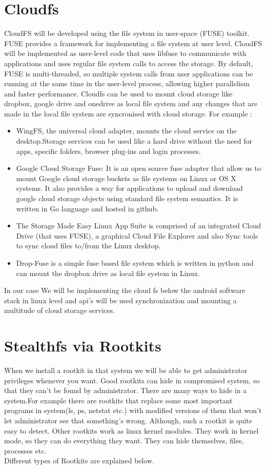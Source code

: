 \section{Cloudfs}
CloudFS will be developed using the file system in user-space (FUSE) toolkit. FUSE provides a framework for implementing a file system at user level.  CloudFS will be implemented  as user-level code that uses libfuse to communicate with  applications  and uses regular file system calls  to access the storage. By default, FUSE is multi-threaded, so multiple system calls from user applications can be running at the same time in the user-level process, allowing higher parallelism and  faster performance. Cloudfs can be used to mount cloud storage like dropbox, google drive and onedrive as local file system and any changes that are made in the local file system are syncronised with cloud storage. For example :
\begin{itemize}
\item WingFS, the universal cloud adapter, mounts the cloud service on the desktop.Storage services can be used  like a hard drive without the need for apps, specific folders, browser plug-ins and login processes.
\item Google Cloud Storage Fuse: It is an open source fuse adapter that allow us to mount Google cloud storage buckets as file systems on Linux or OS X systems. It also provides a way for applications to upload and download google cloud storage objects using standard file system semantics. It is written in Go language and hosted in github.
\item The Storage Made Easy Linux App Suite is comprised of an integrated Cloud Drive (that uses FUSE), a graphical Cloud File Explorer and also Sync tools to sync cloud files to/from the Linux desktop.
\item Drop-Fuse is a simple fuse based file system which is written in python and can mount the dropbox drive as local file system in Linux.


\end{itemize}
In our case We will be implementing the cloud fs below the android software stack in linux level and api's will be used synchronization and mounting a multitude of cloud storage services.
\section{Stealthfs via Rootkits}
When we  install a rootkit in that system we will be able to get administrator privileges whenever you want. Good rootkits can hide in compromised system, so that they can't be found by administrator. There are many ways to hide in a system.For example there are rootkits that replace some most important programs in system(ls, ps, netstat etc.) with modified versions of them that won't let administrator see that something's wrong. Although, such a rootkit is quite easy to detect. Other rootkits work as linux kernel modules. They work in kernel mode, so they can do everything they want. They can hide themselves, files, processes etc.\\
\linebreak
\bigskip 
Different types of Rootkits are explained below.
